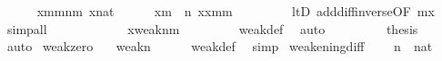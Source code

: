 \begin{isabellebody}
\ \ \ \ \isamarkupfalse%
\ {\isacartoucheopen}x{\isacharhash}{\kern0pt}{\isacharminus}{\kern0pt}m{\isacharless}{\kern0pt}m{\isacharhash}{\kern0pt}{\isacharplus}{\kern0pt}n{\isacharhash}{\kern0pt}{\isacharminus}{\kern0pt}m{\isacartoucheclose}\ {\isacartoucheopen}x{\isasymin}nat{\isacartoucheclose}\isanewline
\ \ \ \ \isamarkupfalse%
\ {\isachardoublequoteopen}x{\isacharhash}{\kern0pt}{\isacharminus}{\kern0pt}m\ {\isasymin}\ n{\isachardoublequoteclose}\ {\isachardoublequoteopen}x{\isacharequal}{\kern0pt}x{\isacharhash}{\kern0pt}{\isacharminus}{\kern0pt}m{\isacharhash}{\kern0pt}{\isacharplus}{\kern0pt}m{\isachardoublequoteclose}\ \isanewline
\ \ \ \ \ \ \isamarkupfalse%
\ ltD\ add{\isacharunderscore}{\kern0pt}diff{\isacharunderscore}{\kern0pt}inverse{}{\isacharbrackleft}{\kern0pt}OF\ {\isacartoucheopen}m{\isasymle}x{\isacartoucheclose}{\isacharbrackright}{\kern0pt}\ \isamarkupfalse%
\ simp{\isacharunderscore}{\kern0pt}all\isanewline
\ \ \ \ \isamarkupfalse%
\ \isanewline
\ \ \ \ \isamarkupfalse%
\ {\isachardoublequoteopen}x{\isasymin}weak{\isacharparenleft}{\kern0pt}n{\isacharcomma}{\kern0pt}m{\isacharparenright}{\kern0pt}{\isachardoublequoteclose}\ \isanewline
\ \ \ \ \ \ \isamarkupfalse%
\ weak{\isacharunderscore}{\kern0pt}def\ \isamarkupfalse%
\ auto\isanewline
\ \ \isamarkupfalse%
\isanewline
\ \ \isamarkupfalse%
\isanewline
\ \ \isamarkupfalse%
\ {\isacharquery}{\kern0pt}thesis\ \isamarkupfalse%
\ auto\isanewline
{}\isamarkupfalse%
%
\endisatagproof
{\isafoldproof}%
%
\isadelimproof
\isanewline
%
\endisadelimproof
\isanewline
{}\isamarkupfalse%
\ weak{\isacharunderscore}{\kern0pt}zero{\isacharcolon}{\kern0pt}\isanewline
\ \ \ {\isachardoublequoteopen}weak{\isacharparenleft}{\kern0pt}{}{\isacharcomma}{\kern0pt}n{\isacharparenright}{\kern0pt}\ {\isacharequal}{\kern0pt}\ {}{\isachardoublequoteclose}\isanewline
%
\isadelimproof
\ \ %
\endisadelimproof
%
\isatagproof
{}\isamarkupfalse%
\ weak{\isacharunderscore}{\kern0pt}def\ \isamarkupfalse%
\ simp%
\endisatagproof
{\isafoldproof}%
%
\isadelimproof
\isanewline
%
\endisadelimproof
\isanewline
{}\isamarkupfalse%
\ weakening{\isacharunderscore}{\kern0pt}diff\ {\isacharcolon}{\kern0pt}\isanewline
\ \ \ {\isachardoublequoteopen}n\ {\isasymin}\ nat{\isachardoublequoteclose}\isanewline

\end{isabellebody}
